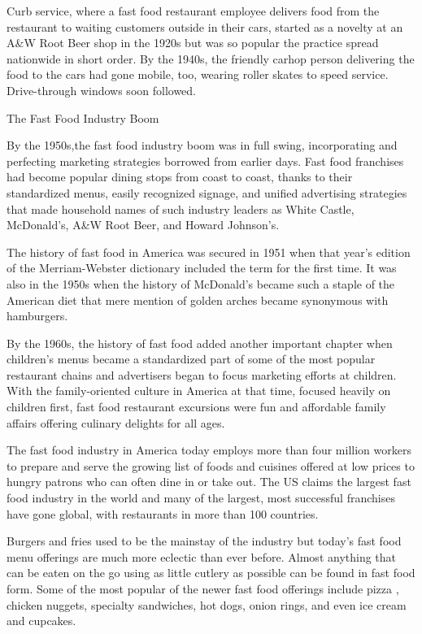 \documentclass{book}\usepackage[]{graphicx}\usepackage[]{color}
\begin{document}
Curb service, where a fast food restaurant employee delivers food from the restaurant to waiting customers outside in their cars, started as a novelty at an A\&W Root Beer shop in the 1920s but was so popular the practice spread nationwide in short order. By the 1940s, the friendly carhop person delivering the food to the cars had gone mobile, too, wearing roller skates to speed service. Drive-through windows soon followed.

The Fast Food Industry Boom

By the 1950s,the fast food industry boom  was in full swing, incorporating and perfecting marketing strategies borrowed from earlier days. Fast food franchises had become popular dining stops from coast to coast, thanks to their standardized menus, easily recognized signage, and unified advertising strategies that made household names of such industry leaders as White Castle, McDonald's, A\&W Root Beer, and Howard Johnson's.

The history of fast food in America was secured in 1951 when that year's edition of the Merriam-Webster dictionary included the term for the first time. It was also in the 1950s when the history of McDonald's became such a staple of the American diet that mere mention of golden arches became synonymous with hamburgers.

By the 1960s, the history of fast food added another important chapter when children's menus became a standardized part of some of the most popular restaurant chains and advertisers began to focus marketing efforts at children. With the family-oriented culture in America at that time, focused heavily on children first, fast food restaurant excursions were fun and affordable family affairs offering culinary delights for all ages.

The fast food industry in America today employs more than four million workers to prepare and serve the growing list of foods and cuisines offered at low prices to hungry patrons who can often dine in or take out. The US claims the largest fast food industry in the world and many of the largest, most successful franchises have gone global, with restaurants in more than 100 countries.

Burgers and fries used to be the mainstay of the industry but today's fast food menu offerings are much more eclectic than ever before. Almost anything that can be eaten on the go using as little cutlery as possible can be found in fast food form. Some of the most popular of the newer fast food offerings include pizza , chicken nuggets, specialty sandwiches, hot dogs, onion rings, and even ice cream and cupcakes.
\end{document}
